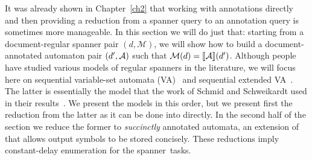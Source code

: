 
It was already shown in Chapter~\ref{ch2} that working with annotations directly and then providing a reduction from a spanner query to an annotation query is sometimes more manageable. In this section we will do just that: starting from a document-regular spanner pair $(d, \mathcal{M})$, we will show how to build a document-annotated automaton pair $(d', \mathcal{A})$ such that $\mathcal{M}(d) = {\llbracket{\mathcal{A}}\rrbracket}(d')$. Although people have studied various models of regular spanners in the literature, we will focus here on sequential variable-set automata (VA)~\cite{FaginKRV15} and sequential extended VA~\cite{FlorenzanoRUVV20}. The latter is essentially the model that the work of Schmid and Schweikardt used in their results~\cite{SchmidS21}. We present the models in this order, but we present first the reduction from the latter as it can be done into \rt directly.
In the second half of the section we reduce the former to {\it succinctly} annotated automata, an extension of \rt that allows output symbols to be stored concisely. 
These reductions imply constant-delay enumeration for the spanner~tasks.

